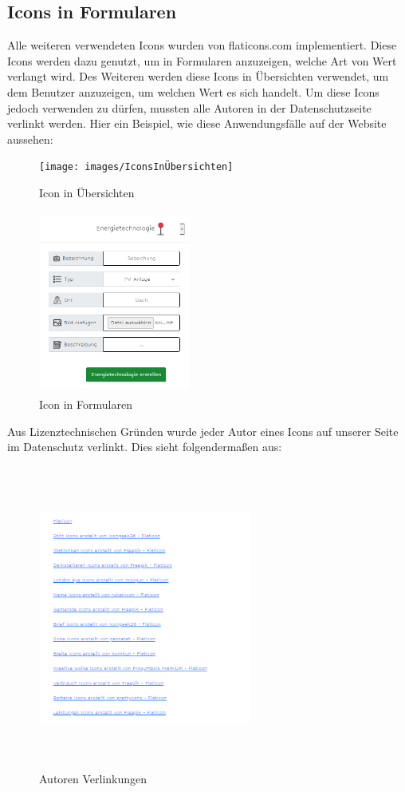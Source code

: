 \subsection{Icons in Formularen}
Alle weiteren verwendeten Icons wurden von flaticons.com implementiert. Diese Icons werden dazu genutzt, um in Formularen anzuzeigen, welche Art von Wert verlangt wird. Des Weiteren werden diese Icons in Übersichten verwendet, um dem Benutzer anzuzeigen, um welchen Wert es sich handelt. Um diese Icons jedoch verwenden zu dürfen, mussten alle Autoren in der Datenschutzseite verlinkt werden. Hier ein Beispiel, wie diese Anwendungsfälle auf der Website aussehen:
\begin{figure}[h]
	\centering
	\texttt{[image: images/IconsInÜbersichten]}
	\caption{Icon in Übersichten}
	\label{fig: Icons in Übersichten}
\end{figure}
\newpage
\begin{figure}[h]
	\centering
	\includegraphics[height=6cm,width=5cm]{images/IconsInFormularen}
	\caption{Icon in Formularen}
	\label{fig: Icons in Formularen}
\end{figure}
\newpage
Aus Lizenztechnischen Gründen wurde jeder Autor eines Icons auf unserer Seite im Datenschutz verlinkt. Dies sieht folgendermaßen aus:
\begin{figure}[h]
	\centering
	\includegraphics[height=10cm,width=7cm]{images/IconAutorVerlinkungen}
	\caption{Autoren Verlinkungen}
	\label{fig: Autoren Verlinkungen}
\end{figure}

